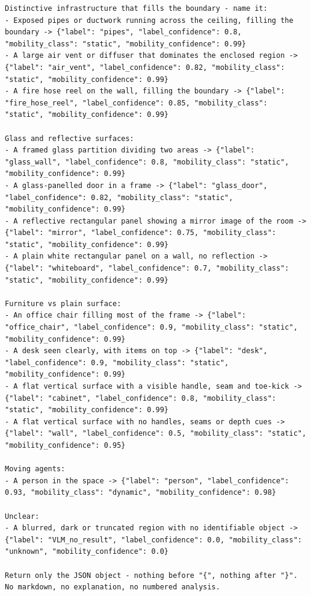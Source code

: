 \begin{lstlisting}[style=promptstyle]
Distinctive infrastructure that fills the boundary - name it:
- Exposed pipes or ductwork running across the ceiling, filling the boundary -> {"label": "pipes", "label_confidence": 0.8, "mobility_class": "static", "mobility_confidence": 0.99}
- A large air vent or diffuser that dominates the enclosed region -> {"label": "air_vent", "label_confidence": 0.82, "mobility_class": "static", "mobility_confidence": 0.99}
- A fire hose reel on the wall, filling the boundary -> {"label": "fire_hose_reel", "label_confidence": 0.85, "mobility_class": "static", "mobility_confidence": 0.99}

Glass and reflective surfaces:
- A framed glass partition dividing two areas -> {"label": "glass_wall", "label_confidence": 0.8, "mobility_class": "static", "mobility_confidence": 0.99}
- A glass-panelled door in a frame -> {"label": "glass_door", "label_confidence": 0.82, "mobility_class": "static", "mobility_confidence": 0.99}
- A reflective rectangular panel showing a mirror image of the room -> {"label": "mirror", "label_confidence": 0.75, "mobility_class": "static", "mobility_confidence": 0.99}
- A plain white rectangular panel on a wall, no reflection -> {"label": "whiteboard", "label_confidence": 0.7, "mobility_class": "static", "mobility_confidence": 0.99}

Furniture vs plain surface:
- An office chair filling most of the frame -> {"label": "office_chair", "label_confidence": 0.9, "mobility_class": "static", "mobility_confidence": 0.99}
- A desk seen clearly, with items on top -> {"label": "desk", "label_confidence": 0.9, "mobility_class": "static", "mobility_confidence": 0.99}
- A flat vertical surface with a visible handle, seam and toe-kick -> {"label": "cabinet", "label_confidence": 0.8, "mobility_class": "static", "mobility_confidence": 0.99}
- A flat vertical surface with no handles, seams or depth cues -> {"label": "wall", "label_confidence": 0.5, "mobility_class": "static", "mobility_confidence": 0.95}

Moving agents:
- A person in the space -> {"label": "person", "label_confidence": 0.93, "mobility_class": "dynamic", "mobility_confidence": 0.98}

Unclear:
- A blurred, dark or truncated region with no identifiable object -> {"label": "VLM_no_result", "label_confidence": 0.0, "mobility_class": "unknown", "mobility_confidence": 0.0}

Return only the JSON object - nothing before "{", nothing after "}". No markdown, no explanation, no numbered analysis.


\end{lstlisting}
